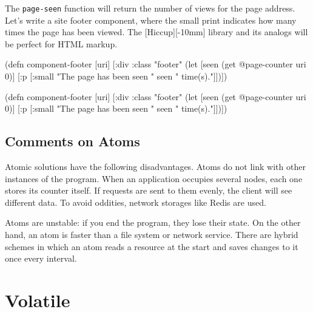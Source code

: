 
The \verb|page-seen| function will return the number of views for the page address.
Let's write a site footer component, where the small print indicates how many times the page has been viewed. The [Hiccup][-10mm] library and its analogs will be perfect for HTML markup.

\ifx\DEVICETYPE\MOBILE

\begin{english}
  \begin{clojure}
(defn component-footer [uri]
  [:div {:class "footer"}
   (let [seen (get @page-counter uri 0)]
     [:p [:small
          "The page has been seen " seen
          " time(s)."]])])
  \end{clojure}
\end{english}

\else

\begin{english}
  \begin{clojure}
(defn component-footer [uri]
  [:div {:class "footer"}
   (let [seen (get @page-counter uri 0)]
     [:p [:small "The page has been seen " seen " time(s)."]])])
  \end{clojure}
\end{english}

\fi

\subsection{Comments on Atoms}

Atomic solutions have the following disadvantages.
Atoms do not link with other instances of the program. When an application occupies several nodes, each one stores its counter itself.
If requests are sent to them evenly, the client will see different data.
To avoid oddities, network storages like Redis are used.


Atoms are unstable: if you end the program, they lose their state.
On the other hand, an atom is faster than a file system or network service.
There are hybrid schemes in which an atom reads a resource at the start and saves changes to it once every interval.

\section{Volatile}

